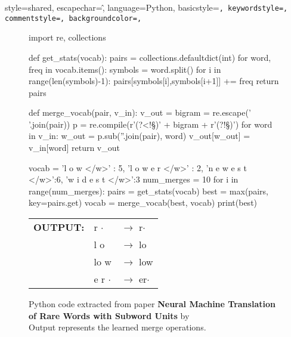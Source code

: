 {
    style=shared,
    escapechar=\^,
    language={Python},
    basicstyle=\small\tt,
    keywordstyle=\color{blue},
    commentstyle=\color[rgb]{0.13,0.54,0.13},
    backgroundcolor=\color{cyan!5},
}

{\lstset{style=python}}
{}

\begin{figure}
\begin{python}[!h]
import re, collections

def get_stats(vocab):
    pairs = collections.defaultdict(int)
    for word, freq in vocab.items():
    symbols = word.split()
    for i in range(len(symbols)-1):
        pairs[symbols[i],symbols[i+1]] += freq
    return pairs

def merge_vocab(pair, v_in):
    v_out = {}
    bigram = re.escape(' '.join(pair))
    p = re.compile(r'(?<!\S)' + bigram + r'(?!\S)')
    for word in v_in:
        w_out = p.sub(''.join(pair), word)
        v_out[w_out] = v_in[word]
    return v_out

vocab = {'l o w </w>' : 5, 'l o w e r </w>' : 2,
            'n e w e s t </w>':6, 'w i d e s t </w>':3}
num_merges = 10
for i in range(num_merges):
    pairs = get_stats(vocab)
    best = max(pairs, key=pairs.get)
    vocab = merge_vocab(best, vocab)
    print(best)
\end{python}
\centering
\begin{tabular}{lll}

    \textbf{OUTPUT:} & r $\cdot$  &$\rightarrow$ r$\cdot$ \\
                    & l o         &$\rightarrow$ lo \\
                    & lo w        &$\rightarrow$ low \\
                    & e r $\cdot$ &$\rightarrow$ er$\cdot$ \\
\end{tabular}
\caption{Python code extracted from paper \textbf{Neural Machine Translation of Rare Words with Subword Units} by \citep{sennrich2016} \\ \centering Output represents the learned merge operations.}
\label{bpe-algorithm}
\end{figure}
